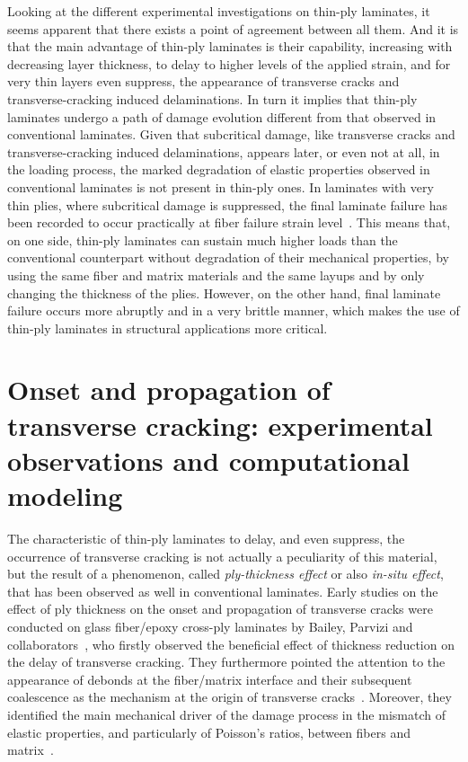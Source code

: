 Looking at the different experimental investigations on thin-ply laminates, it seems apparent that there exists a point of agreement between all them. And it is that the main advantage of thin-ply laminates is their capability, increasing with decreasing layer thickness, to delay to higher levels of the applied strain, and for very thin layers even suppress, the appearance of transverse cracks and transverse-cracking induced delaminations. In turn it implies that thin-ply laminates undergo a path of damage evolution different from that observed in conventional laminates. Given that subcritical damage, like transverse cracks and transverse-cracking induced delaminations, appears later, or even not at all, in the loading process, the marked degradation of elastic properties observed in conventional laminates is not present in thin-ply ones. In laminates with very thin plies, where subcritical damage is suppressed, the final laminate failure has been recorded to occur practically at fiber failure strain level~\cite{Cugnoni2018}. This means that, on one side, thin-ply laminates can sustain much higher loads than the conventional counterpart without degradation of their mechanical properties, by using the same fiber and matrix materials and the same layups and by only changing the thickness of the plies. However, on the other hand, final laminate failure occurs more abruptly and in a very brittle manner, which makes the use of thin-ply laminates in structural applications more critical.

\section{Onset and propagation of transverse cracking: experimental observations and computational modeling}

The characteristic of thin-ply laminates to delay, and even suppress, the occurrence of transverse cracking is not actually a peculiarity of this material, but the result of a phenomenon, called \emph{ply-thickness effect} or also \emph{in-situ effect}, that has been observed as well in conventional laminates. Early studies on the effect of ply thickness on the onset and propagation of transverse cracks were conducted on glass fiber/epoxy cross-ply laminates by Bailey, Parvizi and collaborators~\cite{Garrett1977,Parvizi1978a,Parvizi1978b}, who firstly observed the beneficial effect of thickness reduction on the delay of transverse cracking. They furthermore pointed the attention to the appearance of debonds at the fiber/matrix interface and their subsequent coalescence as the mechanism at the origin of transverse cracks~\cite{Bailey1981}. Moreover, they identified the main mechanical driver of the damage process in the mismatch of elastic properties, and particularly of Poisson's ratios, between fibers and matrix~\cite{Bailey1979}.

